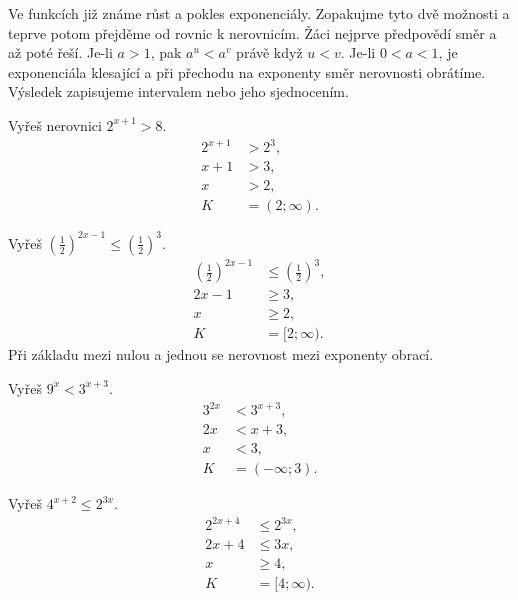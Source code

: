 \documentclass[11pt,a4paper]{article}
\begin{document}
Ve funkcích již známe růst a pokles exponenciály. Zopakujme tyto dvě možnosti a teprve potom přejděme od rovnic k nerovnicím. Žáci nejprve předpovědí směr a až poté řeší.
Je-li $a>1$, pak $a^u<a^v$ právě když $u<v$. Je-li $0<a<1$, je exponenciála klesající a při přechodu na exponenty směr nerovnosti obrátíme. Výsledek zapisujeme intervalem nebo jeho sjednocením.
\begin{prikladReseniBox}[title={Příklad 1}]
Vyřeš nerovnici $2^{x+1}>8$.
\tcblower
\[
\begin{aligned}2^{x+1}&>2^3,\\x+1&>3,\\x&>2,\\K&=(2;\infty).\end{aligned}
\]

\end{prikladReseniBox}
\begin{prikladReseniBox}[title={Příklad 2}]
Vyřeš $\left(\frac12\right)^{2x-1}\le\left(\frac12\right)^3$.
\tcblower
\[
\begin{aligned}\left(\frac12\right)^{2x-1}&\le\left(\frac12\right)^3,\\2x-1&\ge3,\\x&\ge2,\\K&=[2;\infty).\end{aligned}
\]
Při základu mezi nulou a jednou se nerovnost mezi exponenty obrací.
\end{prikladReseniBox}
\begin{prikladReseniBox}[title={Příklad 3}]
Vyřeš $9^x<3^{x+3}$.
\tcblower
\[
\begin{aligned}3^{2x}&<3^{x+3},\\2x&<x+3,\\x&<3,\\K&=(-\infty;3).\end{aligned}
\]

\end{prikladReseniBox}
\begin{prikladReseniBox}[title={Příklad 4}]
Vyřeš $4^{x+2}\le2^{3x}$.
\tcblower
\[
\begin{aligned}2^{2x+4}&\le2^{3x},\\2x+4&\le3x,\\x&\ge4,\\K&=[4;\infty).\end{aligned}
\]

\end{prikladReseniBox}
\end{document}
